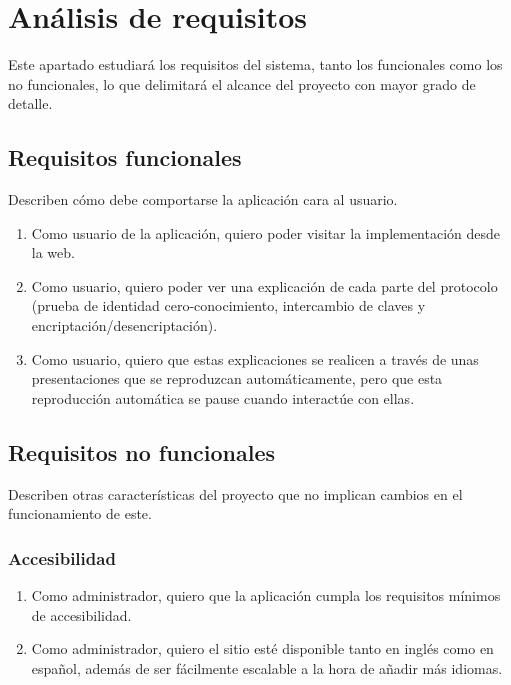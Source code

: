 \chapter{Análisis de requisitos}\label{requisitos}

Este apartado estudiará los requisitos del sistema, tanto los funcionales como los no funcionales, lo que delimitará el alcance del proyecto con mayor grado de detalle.

\section{Requisitos funcionales}

Describen cómo debe comportarse la aplicación cara al usuario.

\begin{enumerate}
    \item Como usuario de la aplicación, quiero poder visitar la implementación desde la web.

    \item Como usuario, quiero poder ver una explicación de cada parte del protocolo (prueba de identidad cero-conocimiento, intercambio de claves y encriptación/desencriptación).

    \item Como usuario, quiero que estas explicaciones se realicen a través de unas presentaciones que se reproduzcan automáticamente, pero que esta reproducción automática se pause cuando interactúe con ellas.
\end{enumerate}

\section{Requisitos no funcionales}

Describen otras características del proyecto que no implican cambios en el funcionamiento de este.

\subsection{Accesibilidad}

\begin{enumerate}
    \item Como administrador, quiero que la aplicación cumpla los requisitos mínimos de accesibilidad.

    \item Como administrador, quiero el sitio esté disponible tanto en inglés como en español, además de ser fácilmente escalable a la hora de añadir más idiomas.
\end{enumerate}

